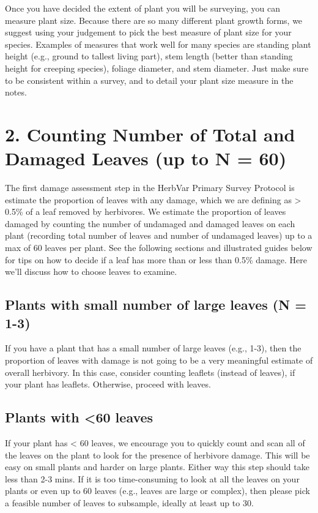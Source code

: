 \documentclass[
  letterpaper,
  DIV=11,
  numbers=noendperiod]{scrreprt}
\begin{document}
Once you have decided the extent of plant you will be surveying, you can
measure plant size. Because there are so many different plant growth
forms, we suggest using your judgement to pick the best measure of plant
size for your species. Examples of measures that work well for many
species are standing plant height (e.g., ground to tallest living part),
stem length (better than standing height for creeping species), foliage
diameter, and stem diameter. Just make sure to be consistent within a
survey, and to detail your plant size measure in the notes.

\section{2. Counting Number of Total and Damaged Leaves (up to N =
60)}\label{counting-number-of-total-and-damaged-leaves-up-to-n-60}

The first damage assessment step in the HerbVar Primary Survey Protocol
is estimate the proportion of leaves with any damage, which we are
defining as \textgreater{} 0.5\% of a leaf removed by herbivores. We
estimate the proportion of leaves damaged by counting the number of
undamaged and damaged leaves on each plant (recording total number of
leaves and number of undamaged leaves) up to a max of 60 leaves per
plant. See the following sections and illustrated guides below for tips
on how to decide if a leaf has more than or less than 0.5\% damage. Here
we'll discuss how to choose leaves to examine.

\subsection{Plants with small number of large leaves (N =
1-3)}\label{plants-with-small-number-of-large-leaves-n-1-3}

If you have a plant that has a small number of large leaves (e.g., 1-3),
then the proportion of leaves with damage is not going to be a very
meaningful estimate of overall herbivory. In this case, consider
counting leaflets (instead of leaves), if your plant has leaflets.
Otherwise, proceed with leaves.

\subsection{Plants with \textless60 leaves}\label{plants-with-60-leaves}

If your plant has \textless{} 60 leaves, we encourage you to quickly
count and scan all of the leaves on the plant to look for the presence
of herbivore damage. This will be easy on small plants and harder on
large plants. Either way this step should take less than 2-3 mins. If it
is too time-consuming to look at all the leaves on your plants or even
up to 60 leaves (e.g., leaves are large or complex), then please pick a
feasible number of leaves to subsample, ideally at least up to 30.
\end{document}
